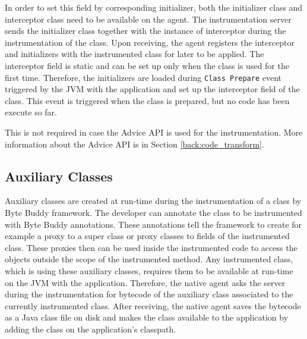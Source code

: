 In order to set this field by corresponding initializer, both the initializer class and interceptor class need to be available on the agent. The instrumentation server sends the initializer class together with the instance of interceptor during the instrumentation of the class. Upon receiving, the agent registers the interceptor and initializers with the instrumented class for later to be applied. The interceptor field is static and can be set up only when the class is used for the first time. Therefore, the initializers are loaded during \texttt{Class Prepare} event triggered by the JVM with the application and set up the interceptor field of the class. This event is triggered when the class is prepared, but no code has been execute so far. 

This is not required in case the Advice API is used for the instrumentation. More information about the Advice API is in Section \ref{back:code_transform}.

\subsection{Auxiliary Classes}
Auxiliary classes are created at run-time during the instrumentation of a class by Byte Buddy framework. The developer can annotate the class to be instrumented with Byte Buddy annotations. These annotations tell the framework to create for example a proxy to a super class or proxy classes to fields of the instrumented class. These proxies then can be used inside the instrumented code to access the objects outside the scope of the instrumented method. Any instrumented class, which is using these auxiliary classes, requires them to be available at run-time on the JVM with the application. Therefore, the native agent asks the server  during the instrumentation for bytecode of the auxiliary class associated to the currently instrumented class. After receiving, the native agent saves the bytecode as a Java class file on disk and makes the class available to the application by adding the class on the application's classpath.

